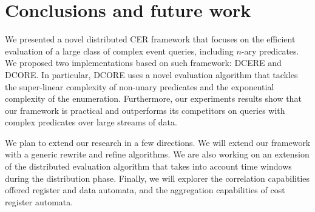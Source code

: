 \chapter{Conclusions and future work}\label{chapter:conclusion}

We presented a novel distributed CER framework that focuses on the efficient evaluation of a large class of complex event queries, including $n$-ary predicates. We proposed two implementations based on such framework: DCERE and DCORE. In particular, DCORE uses a novel evaluation algorithm that tackles the super-linear complexity of non-unary predicates and the exponential complexity of the enumeration. Furthermore, our experiments results show that our framework is practical and outperforms its competitors on queries with complex predicates over large streams of data.

We plan to extend our research in a few directions. We will extend our framework with a generic rewrite and refine algorithms. We are also working on an extension of the distributed evaluation algorithm that takes into account time windows during the distribution phase. Finally, we will explorer the correlation capabilities offered register and data automata, and the aggregation capabilities of cost register automata.
